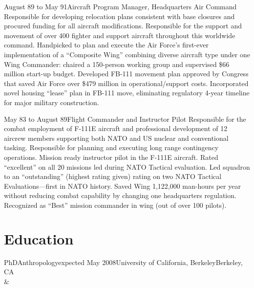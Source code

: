 \documentclass[10pt,letterpaper,lmodern]{mtvita}
\begin{document}
\begin{job}{August 89 to May 91}{Aircraft Program Manager, Headquarters Air Command}{}{%
Responsible for developing relocation plans
consistent with base closures and procured funding for all aircraft modifications. Responsible for the support and movement of over
400 fighter and support aircraft throughout this worldwide command.
}
\accomplishment Handpicked to plan and execute the Air Force's first-ever implementation of a ``Composite Wing'' combining diverse aircraft type
under one Wing Commander: chaired a 150-person working group and supervised \$66 million start-up budget.
\accomplishment Developed FB-111 movement plan approved by Congress that saved Air Force over \$479 million in operational/support costs.
\accomplishment Incorporated novel housing ``lease'' plan in FB-111 move, eliminating regulatory 4-year timeline for major military construction.
\end{job}

\begin{job}{May 83 to August 89}{Flight Commander and Instructor Pilot}{}{%
Responsible for the combat employment of F-111E aircraft and
professional development of 12 aircrew members supporting both NATO and US nuclear and conventional tasking. Responsible for
planning and executing long range contingency operations. Mission ready instructor pilot in the F-111E aircraft.
}
\accomplishment Rated ``excellent'' on all 20 missions led during NATO Tactical evaluation.
\accomplishment Led squadron to an ``outstanding'' (highest rating given) rating on two NATO Tactical Evaluations---first in NATO history.
\accomplishment Saved Wing 1,122,000 man-hours per year without reducing combat capability by changing one headquarters regulation.
\accomplishment Recognized as ``Best'' mission commander in wing (out of over 100 pilots).
\end{job}



\section{Education}

\begin{degree}{PhD}{Anthropology}{expected May 2008}{University of California, Berkeley}{Berkeley, CA}
\\&\begin{accomplishments}
\accomplishment \lipsum[1]
\accomplishment \lipsum[2]
\end{accomplishments}
\end{degree}
\end{document}
